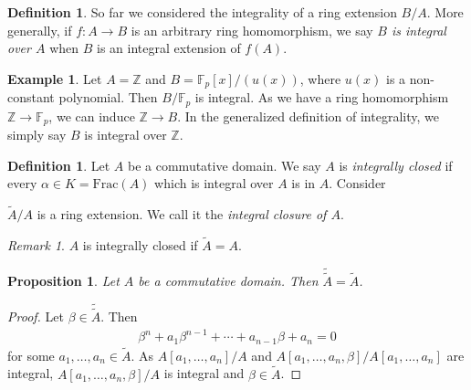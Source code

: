 \documentclass[12pt]{report}
\theoremstyle{plain}
\newtheorem{proposition}[theorem]{Proposition}
\theoremstyle{remark}
\newtheorem*{remark}{Remark}
\theoremstyle{definition}
\newtheorem{definition}[theorem]{Definition}
\newtheorem{example}[theorem]{Example}
\newcommand{\Z}{\mathbb{Z}}
\begin{document}
\begin{definition}
    So far we considered the integrality of a ring extension $B/A$. More generally, if $f:A\to B$ is an arbitrary ring homomorphism, we say \emph{$B$ is integral over $A$} when $B$ is an integral extension of $f(A)$.
\end{definition}

\begin{example}
    Let $A=\Z$ and $B=\mathbb{F}_p[x]/(u(x))$, where $u(x)$ is a non-constant polynomial. Then $B/\mathbb{F}_p$ is integral. As we have a ring homomorphism $\Z\to\mathbb{F}_p$, we can induce $\Z\to B$. In the generalized definition of integrality, we simply say $B$ is integral over $\Z$.
\end{example}

\begin{definition}
    Let $A$ be a commutative domain. We say $A$ is \emph{integrally closed} if every $\alpha\in K=\mathrm{Frac}(A)$ which is integral over $A$ is in $A$. Consider
    \begin{figure}[H]
        \centering
    \end{figure}
    \noindent $\tilde{A}/A$ is a ring extension. We call it the \emph{integral closure of $A$}.
\end{definition}
\begin{remark}
    $A$ is integrally closed if $\tilde{A}=A$.
\end{remark}

\begin{proposition}
    Let $A$ be a commutative domain. Then $\tilde{\tilde{A}}=\tilde{A}$.
\end{proposition}
\begin{proof}
    Let $\beta\in\tilde{\tilde{A}}$. Then
    \begin{align*}
        \beta^n + a_1\beta^{n-1}+\cdots+a_{n-1}\beta+a_n=0
    \end{align*}
    for some $a_1,\dots,a_n\in \tilde{A}$. As $A[a_1,\dots,a_n]/A$ and $A[a_1,\dots,a_n,\beta]/A[a_1,\dots,a_n]$ are integral, $A[a_1,\dots,a_n,\beta]/A$ is integral and $\beta\in \tilde{A}$.
\end{proof}
\end{document}

